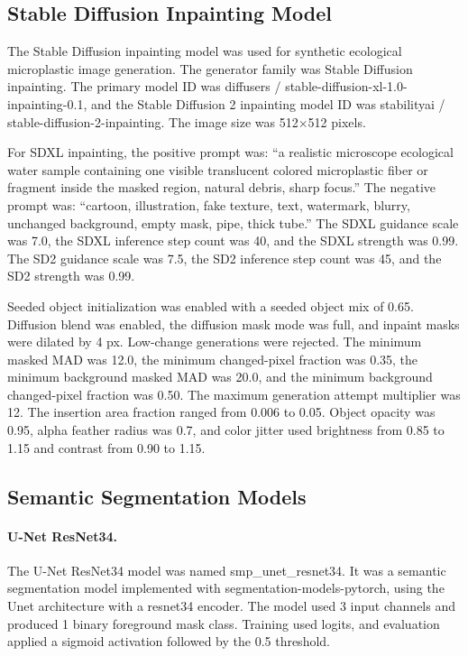 \documentclass[11pt]{article}
\begin{document}
\subsection{Stable Diffusion Inpainting Model}
The Stable Diffusion inpainting model was used for synthetic ecological microplastic image generation. The generator family was Stable Diffusion inpainting. The primary model ID was diffusers / stable-diffusion-xl-1.0-inpainting-0.1, and the Stable Diffusion 2 inpainting model ID was stabilityai / stable-diffusion-2-inpainting. The image size was 512$\times$512 pixels.

For SDXL inpainting, the positive prompt was: ``a realistic microscope ecological water sample containing one visible translucent colored microplastic fiber or fragment inside the masked region, natural debris, sharp focus.'' The negative prompt was: ``cartoon, illustration, fake texture, text, watermark, blurry, unchanged background, empty mask, pipe, thick tube.'' The SDXL guidance scale was 7.0, the SDXL inference step count was 40, and the SDXL strength was 0.99. The SD2 guidance scale was 7.5, the SD2 inference step count was 45, and the SD2 strength was 0.99.

Seeded object initialization was enabled with a seeded object mix of 0.65. Diffusion blend was enabled, the diffusion mask mode was full, and inpaint masks were dilated by 4 px. Low-change generations were rejected. The minimum masked MAD was 12.0, the minimum changed-pixel fraction was 0.35, the minimum background masked MAD was 20.0, and the minimum background changed-pixel fraction was 0.50. The maximum generation attempt multiplier was 12. The insertion area fraction ranged from 0.006 to 0.05. Object opacity was 0.95, alpha feather radius was 0.7, and color jitter used brightness from 0.85 to 1.15 and contrast from 0.90 to 1.15.

\subsection{Semantic Segmentation Models}
\paragraph{U-Net ResNet34.}
The U-Net ResNet34 model was named smp\_unet\_resnet34. It was a semantic segmentation model implemented with segmentation-models-pytorch, using the Unet architecture with a resnet34 encoder. The model used 3 input channels and produced 1 binary foreground mask class. Training used logits, and evaluation applied a sigmoid activation followed by the 0.5 threshold.
\end{document}
